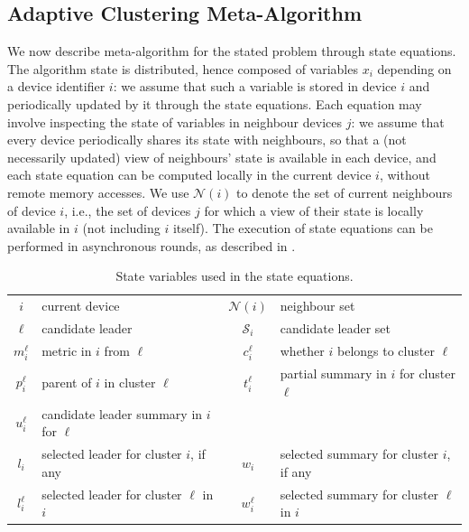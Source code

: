 \subsection{Adaptive Clustering Meta-Algorithm}
\label{ssec:meta-algo}

We now describe  meta-algorithm for the stated problem through state equations.
 The algorithm state is distributed, hence composed of variables $x_i$ depending on a device identifier $i$:
 we assume that such a variable is stored in device $i$ and periodically updated by it through the state equations.
%
Each equation may involve inspecting the state of variables in neighbour devices $j$:
 we assume that every device periodically shares its state with neighbours,
 so that a (not necessarily updated) view of neighbours' state is available in each device,
 and each state equation can be computed locally in the current device $i$, without remote memory accesses.
%
We use $\mathcal{N}(i)$ to denote the set of current neighbours of device $i$, i.e., the set of devices $j$ for which a view of their state is locally available in $i$ (not including $i$ itself).
 The execution of state equations can be performed in asynchronous rounds, as described in .

\begin{table}
\begin{tabular}{clcl}
$i$ & current device &
$\mathcal{N}(i)$ & neighbour set \\
$\ell$ & candidate leader &
$\mathcal{S}_i$ & candidate leader set \\
$m^\ell_i$ & metric in $i$ from $\ell$ &
$c^\ell_i$ & whether $i$ belongs to cluster $\ell$ \\
$p^\ell_i$ & parent of $i$ in cluster $\ell$ &
$t^\ell_i$ & partial summary in $i$ for cluster $\ell$ \\
$u^\ell_i$ & candidate leader summary in $i$ for $\ell$ \\
$l_i$ & selected leader for cluster $i$, if any &
$w_i$ & selected summary for cluster $i$, if any \\
$l^\ell_i$ & selected leader for cluster $\ell$ in $i$ &
$w^\ell_i$ & selected summary for cluster $\ell$ in $i$
\end{tabular}
\caption{State variables used in the state equations.} \label{tab:variables}
\end{table}

